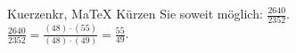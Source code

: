 \begin{MAufgabe}{Kuerzen}{kr, MaTeX}
K\"urzen Sie soweit m\"oglich: $\frac{2640}{2352}$.\\ 
\ifLsg\MLoesung
\quad $\frac{2640}{2352}=\frac{(48)\cdot(55)}{(48)\cdot(49)}=\frac{55}{49}$.\else\relax\fi
 \end{MAufgabe}